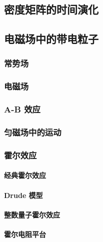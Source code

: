\documentclass[../../main.tex]{subfiles}
\begin{document}
\subsection{密度矩阵的时间演化}

\subsection{电磁场中的带电粒子}
\subsubsection{常势场}
\subsubsection{电磁场}
\subsubsection{A-B 效应}
\subsubsection{匀磁场中的运动}
\subsubsection{霍尔效应}
\paragraph{经典霍尔效应}
\paragraph{Drude 模型}
\paragraph{整数量子霍尔效应}
\paragraph{霍尔电阻平台}
\end{document}
